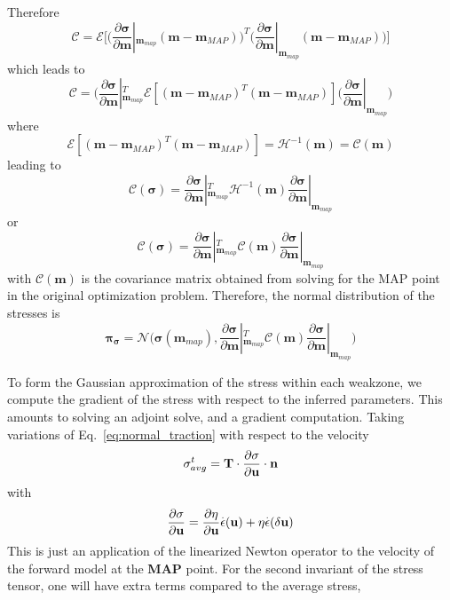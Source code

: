 \documentclass[12pt]{article}
\newcommand{\mm}{{\ensuremath{\boldsymbol{m}}}}
\newcommand{\ppi}{{\ensuremath{\boldsymbol{\pi}}}}
\newcommand{\ssigma}{{\ensuremath{\boldsymbol{\sigma}}}}
\begin{document}
Therefore
\begin{equation}
\mathcal C = \mathcal E\big[\big(\frac{\partial\ssigma}{\partial \mm}|_{\mm_{map}} (\mm-\mm_{MAP})\big)^T\big(\frac{\partial\ssigma}{\partial \mm}|_{\mm_{map}} (\mm-\mm_{MAP})\big)\big]
\end{equation}
which leads to
\begin{equation}
\mathcal C = \big(\frac{\partial\ssigma}{\partial \mm}|_{\mm_{map}}^T \mathcal E[(\mm-\mm_{MAP})^T(\mm-\mm_{MAP})](\frac{\partial\ssigma}{\partial \mm}|_{\mm_{map}}\big)
\end{equation}
where 
\begin{equation}
  \mathcal E[(\mm-\mm_{MAP})^T(\mm-\mm_{MAP})] = \mathcal H^{-1}(\mm) = \mathcal C(\mm)
  \end{equation}
leading to
\begin{equation}
\mathcal C(\ssigma) = \frac{\partial\ssigma}{\partial \mm}|_{\mm_{map}}^T \mathcal H^{-1}(\mm)\frac{\partial\ssigma}{\partial \mm}|_{\mm_{map}}
\end{equation}
or 
\begin{equation}
\mathcal C(\ssigma) = \frac{\partial\ssigma}{\partial \mm}|_{\mm_{map}}^T \mathcal C(\mm)\frac{\partial\ssigma}{\partial \mm}|_{\mm_{map}}
\end{equation}
with $\mathcal C(\mm)$ is the covariance matrix obtained from solving for the MAP point in the original optimization problem. Therefore, the normal distribution of the stresses is
\begin{equation}
  \ppi_{\ssigma} = \mathcal N\big(\ssigma(\mm_{map}), \frac{\partial\ssigma}{\partial \mm}|_{\mm_{map}}^T \mathcal C(\mm)\frac{\partial\ssigma}{\partial \mm}|_{\mm_{map}}\big)
\end{equation}

To form the Gaussian approximation of the stress within each weakzone, we compute the gradient of the stress with respect to the inferred parameters. This amounts to solving an adjoint solve, and a gradient computation. Taking variations of Eq.~\eqref{eq:normal_traction} with respect to the velocity
\begin{equation}
\sigma^t_{avg}=\textbf{T}\cdot\frac{\partial\sigma}{\partial \textbf u}\cdot \textbf n
\end{equation}
with
\begin{equation}
\frac{\partial\sigma}{\partial \textbf u} = \frac{\partial \eta}{\partial \textbf u}\overset{.}{\epsilon}(\textbf u)
                                            + \eta\overset{.}{\epsilon}(\delta \textbf u)
\end{equation}
This is just an application of the linearized Newton operator to the velocity of the forward model at the \textbf{MAP} point.
For the second invariant of the stress tensor, one will have extra terms compared to the average stress,
\end{document}
